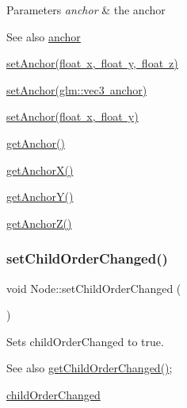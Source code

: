 \begin{DoxyParams}{Parameters}
{\em anchor} & the anchor \\
\hline
\end{DoxyParams}
\begin{DoxySeeAlso}{See also}
\mbox{\hyperlink{classsage_1_1Node_a8698d732514fa2caba0ccee46dbae17a}{anchor}} 

\mbox{\hyperlink{classsage_1_1Node_a04d15cec594320725e6ef44756346d2a}{set\+Anchor(float x, float y, float z)}} 

\mbox{\hyperlink{classsage_1_1Node_a96a786cd6d6750d60c8195aa4895de7c}{set\+Anchor(glm\+::vec3 anchor)}} 

\mbox{\hyperlink{classsage_1_1Node_a8813a645a74f6ab59b25d434e65035c6}{set\+Anchor(float x, float y)}} 

\mbox{\hyperlink{classsage_1_1Node_a1314e39981d8adee8a75c96f29c9e181}{get\+Anchor()}} 

\mbox{\hyperlink{classsage_1_1Node_aa5f31c33d60b32b618d3beaf4e5c6c51}{get\+Anchor\+X()}} 

\mbox{\hyperlink{classsage_1_1Node_a78c5f86d0081854603178fb52d8c0a9b}{get\+Anchor\+Y()}} 

\mbox{\hyperlink{classsage_1_1Node_a13d0e0b056b8e29091e385f17f8c62f6}{get\+Anchor\+Z()}} 
\end{DoxySeeAlso}
\mbox{\label{classsage_1_1Node_adaf7f298bffc7e09d6b4dd4f7c7e0e1a}} 
\subsubsection{\texorpdfstring{setChildOrderChanged()}{setChildOrderChanged()}}
{\footnotesize\ttfamily void Node\+::set\+Child\+Order\+Changed (\begin{DoxyParamCaption}{ }\end{DoxyParamCaption})\hspace{0.3cm}{\ttfamily [protected]}}



Sets child\+Order\+Changed to true. 

\begin{DoxySeeAlso}{See also}
\mbox{\hyperlink{classsage_1_1Node_a983910d41113519eb25d015eac2b4ad0}{get\+Child\+Order\+Changed()}}; 

\mbox{\hyperlink{classsage_1_1Node_af78e7de5e455b1c64036f09a8889f51d}{child\+Order\+Changed}} 
\end{DoxySeeAlso}
\mbox{\label{classsage_1_1Node_abc36311ef7bb8ba6380d403b577fff90}} 
